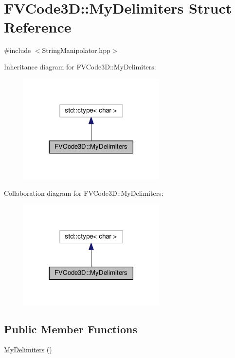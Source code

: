\hypertarget{structFVCode3D_1_1MyDelimiters}{}\section{F\+V\+Code3D\+:\+:My\+Delimiters Struct Reference}
\label{structFVCode3D_1_1MyDelimiters}


{\ttfamily \#include $<$String\+Manipolator.\+hpp$>$}



Inheritance diagram for F\+V\+Code3D\+:\+:My\+Delimiters\+:
\nopagebreak
\begin{figure}[H]
\begin{center}
\leavevmode
\includegraphics[width=209pt]{structFVCode3D_1_1MyDelimiters__inherit__graph}
\end{center}
\end{figure}


Collaboration diagram for F\+V\+Code3D\+:\+:My\+Delimiters\+:
\nopagebreak
\begin{figure}[H]
\begin{center}
\leavevmode
\includegraphics[width=209pt]{structFVCode3D_1_1MyDelimiters__coll__graph}
\end{center}
\end{figure}
\subsection*{Public Member Functions}
\begin{DoxyCompactItemize}
\item 
\hyperlink{structFVCode3D_1_1MyDelimiters_adb7e5521ba8b5e71c6a3761bfcf772dc}{My\+Delimiters} ()
\end{DoxyCompactItemize}

